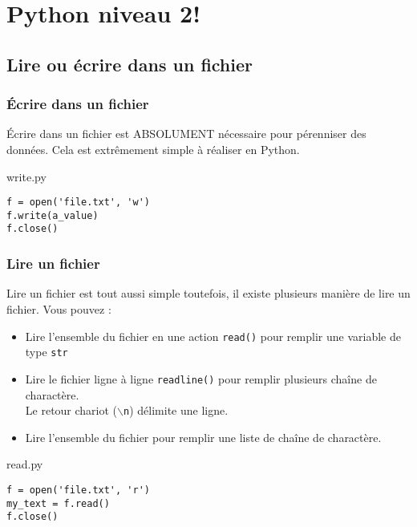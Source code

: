 \section{Python niveau 2!}


\subsection{Lire ou écrire dans un fichier}

\subsubsection{Écrire dans un fichier}

Écrire dans un fichier est ABSOLUMENT nécessaire pour pérenniser des données.
Cela est extrêmement simple à réaliser en Python.



\vskip 2pt
\begin{center}
  \begin{myterminalbox}[colback=gray!10]{write.py}
\begin{verbatim}
f = open('file.txt', 'w')
f.write(a_value)
f.close()
\end{verbatim}
  \end{myterminalbox}
\end{center}

\subsubsection{Lire un fichier }

Lire un fichier est tout aussi simple toutefois, il existe plusieurs manière de lire un fichier.
Vous pouvez :
\begin{itemize}
\item Lire l'ensemble du fichier en une action \texttt{read()} pour remplir une variable de type \texttt{str}
\item Lire le fichier ligne à ligne \texttt{readline()} pour remplir plusieurs chaîne de charactère.\\
  Le retour chariot (\texttt{$\backslash$n}) délimite une ligne.
\item Lire l'ensemble du fichier pour remplir une liste de chaîne de charactère.
\end{itemize}


\vskip 2pt
\begin{center}
  \begin{myterminalbox}[colback=gray!10]{read.py}
\begin{verbatim}
f = open('file.txt', 'r')
my_text = f.read()
f.close()
\end{verbatim}
  \end{myterminalbox}
\end{center}

